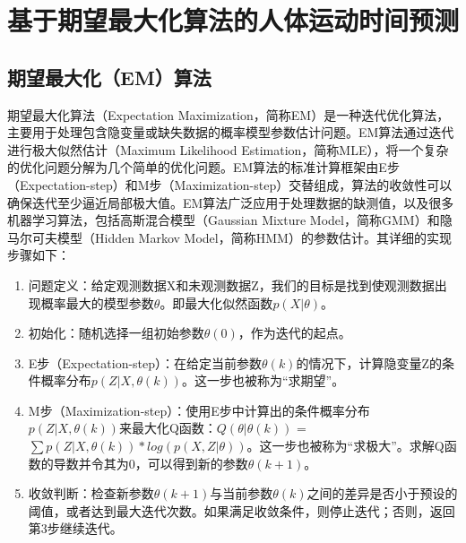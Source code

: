 \section{基于期望最大化算法的人体运动时间预测}
\subsection{期望最大化（EM）算法}
期望最大化算法（Expectation Maximization，简称EM）是一种迭代优化算法，主要用于处理包含隐变量或缺失数据的概率模型参数估计问题。EM算法通过迭代进行极大似然估计（Maximum Likelihood Estimation，简称MLE），将一个复杂的优化问题分解为几个简单的优化问题。EM算法的标准计算框架由E步（Expectation-step）和M步（Maximization-step）交替组成，算法的收敛性可以确保迭代至少逼近局部极大值。EM算法广泛应用于处理数据的缺测值，以及很多机器学习算法，包括高斯混合模型（Gaussian Mixture Model，简称GMM）和隐马尔可夫模型（Hidden Markov Model，简称HMM）的参数估计。其详细的实现步骤如下：

\begin{enumerate}
\item 问题定义：给定观测数据X和未观测数据Z，我们的目标是找到使观测数据出现概率最大的模型参数$θ$。即最大化似然函数$p(X|θ)$。

\item 初始化：随机选择一组初始参数$θ(0)$，作为迭代的起点。

\item E步（Expectation-step）：在给定当前参数$θ(k)$的情况下，计算隐变量Z的条件概率分布$p(Z|X, θ(k))$。这一步也被称为“求期望”。

\item M步（Maximization-step）：使用E步中计算出的条件概率分布$p(Z|X, θ(k))$来最大化Q函数：$Q(θ|θ(k))$ = $\sum p(Z|X, θ(k)) * log(p(X, Z|θ))$。这一步也被称为``求极大''。求解Q函数的导数并令其为0，可以得到新的参数$θ(k+1)$。

\item 收敛判断：检查新参数$θ(k+1)$与当前参数$θ(k)$之间的差异是否小于预设的阈值，或者达到最大迭代次数。如果满足收敛条件，则停止迭代；否则，返回第3步继续迭代。
\end{enumerate}

